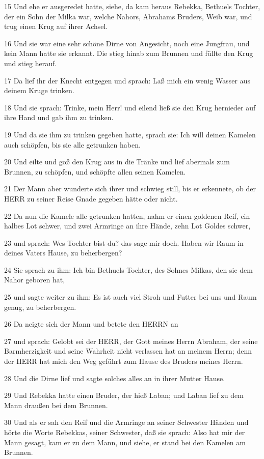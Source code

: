 \par 15 Und ehe er ausgeredet hatte, siehe, da kam heraus Rebekka, Bethuels Tochter, der ein Sohn der Milka war, welche Nahors, Abrahams Bruders, Weib war, und trug einen Krug auf ihrer Achsel.
\par 16 Und sie war eine sehr schöne Dirne von Angesicht, noch eine Jungfrau, und kein Mann hatte sie erkannt. Die stieg hinab zum Brunnen und füllte den Krug und stieg herauf.
\par 17 Da lief ihr der Knecht entgegen und sprach: Laß mich ein wenig Wasser aus deinem Kruge trinken.
\par 18 Und sie sprach: Trinke, mein Herr! und eilend ließ sie den Krug hernieder auf ihre Hand und gab ihm zu trinken.
\par 19 Und da sie ihm zu trinken gegeben hatte, sprach sie: Ich will deinen Kamelen auch schöpfen, bis sie alle getrunken haben.
\par 20 Und eilte und goß den Krug aus in die Tränke und lief abermals zum Brunnen, zu schöpfen, und schöpfte allen seinen Kamelen.
\par 21 Der Mann aber wunderte sich ihrer und schwieg still, bis er erkennete, ob der HERR zu seiner Reise Gnade gegeben hätte oder nicht.
\par 22 Da nun die Kamele alle getrunken hatten, nahm er einen goldenen Reif, ein halbes Lot schwer, und zwei Armringe an ihre Hände, zehn Lot Goldes schwer,
\par 23 und sprach: Wes Tochter bist du? das sage mir doch. Haben wir Raum in deines Vaters Hause, zu beherbergen?
\par 24 Sie sprach zu ihm: Ich bin Bethuels Tochter, des Sohnes Milkas, den sie dem Nahor geboren hat,
\par 25 und sagte weiter zu ihm: Es ist auch viel Stroh und Futter bei uns und Raum genug, zu beherbergen.
\par 26 Da neigte sich der Mann und betete den HERRN an
\par 27 und sprach: Gelobt sei der HERR, der Gott meines Herrn Abraham, der seine Barmherzigkeit und seine Wahrheit nicht verlassen hat an meinem Herrn; denn der HERR hat mich den Weg geführt zum Hause des Bruders meines Herrn.
\par 28 Und die Dirne lief und sagte solches alles an in ihrer Mutter Hause.
\par 29 Und Rebekka hatte einen Bruder, der hieß Laban; und Laban lief zu dem Mann draußen bei dem Brunnen.
\par 30 Und als er sah den Reif und die Armringe an seiner Schwester Händen und hörte die Worte Rebekkas, seiner Schwester, daß sie sprach: Also hat mir der Mann gesagt, kam er zu dem Mann, und siehe, er stand bei den Kamelen am Brunnen.
